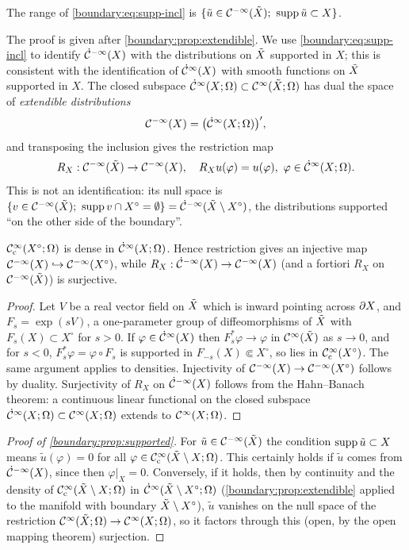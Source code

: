 \begin{proposition}\label{boundary:prop:supported}
The range of \eqref{boundary:eq:supp-incl} is $\{\tilde u\in\mathcal{C}^{-\infty}(\tilde{X});\
\operatorname{supp}\tilde u\subset X\}$.
\end{proposition}

The proof is given after \cref{boundary:prop:extendible}. We use
\eqref{boundary:eq:supp-incl} to identify $\dot{\mathcal{C}}^{-\infty}(X)$ with the distributions on $\tilde{X}$
supported in $X$; this is consistent with the identification of $\dot{\mathcal{C}}^\infty(X)$ with
smooth functions on $\tilde{X}$ supported in $X$. The closed subspace $\dot{\mathcal{C}}^\infty(X;\Omega)\subset
\mathcal{C}^\infty(\tilde{X};\Omega)$ has dual the space of \emph{extendible distributions}
\begin{equation*}
\mathcal{C}^{-\infty}(X)=\big(\dot{\mathcal{C}}^\infty(X;\Omega)\big)',
\end{equation*}
and transposing the inclusion gives the restriction map
\begin{equation}\label{boundary:eq:RX}
R_X:\CmI(\Xt)\to\CmI(X),\quad R_Xu(\varphi)=u(\varphi),\ \varphi\in\dCI(X;\Omega).
\end{equation}
This is not an identification: its null space is
$\{v\in\mathcal{C}^{-\infty}(\tilde{X});\ \operatorname{supp} v\cap X^\circ=\emptyset\}=\dot{\mathcal{C}}^{-\infty}(\tilde{X}\setminus X^\circ)$, the
distributions supported ``on the other side of the boundary''.

\begin{proposition}\label{boundary:prop:extendible}
$\mathcal{C}^\infty_{\mathrm{c}}(X^\circ;\Omega)$ is dense in $\dot{\mathcal{C}}^\infty(X;\Omega)$. Hence restriction gives an
injective map $\mathcal{C}^{-\infty}(X)\hookrightarrow\mathcal{C}^{-\infty}(X^\circ)$, while $R_X:\dot{\mathcal{C}}^{-\infty}(X)\to\mathcal{C}^{-\infty}(X)$
(and a fortiori $R_X$ on $\mathcal{C}^{-\infty}(\tilde{X})$) is surjective.
\end{proposition}
\begin{proof}
Let $V$ be a real vector field on $\tilde{X}$ which is inward pointing across $\partial X$, and
$F_s=\exp(sV)$, a one-parameter group of diffeomorphisms of $\tilde{X}$ with $F_s(X)\subset
X^\circ$ for $s>0$. If $\varphi\in\dot{\mathcal{C}}^\infty(X)$ then $F_s^*\varphi\to\varphi$ in $\mathcal{C}^\infty(\tilde{X})$
as $s\to0$, and for $s<0$, $F_s^*\varphi=\varphi\circ F_s$ is supported in
$F_{-s}(X)\Subset X^\circ$, so lies in $\mathcal{C}^\infty_{\mathrm{c}}(X^\circ)$. The same argument applies to
densities. Injectivity of $\mathcal{C}^{-\infty}(X)\to\mathcal{C}^{-\infty}(X^\circ)$ follows by duality. Surjectivity
of $R_X$ on $\dot{\mathcal{C}}^{-\infty}(X)$ follows from the Hahn--Banach theorem: a continuous linear
functional on the closed subspace $\dot{\mathcal{C}}^\infty(X;\Omega)\subset\mathcal{C}^\infty(X;\Omega)$ extends to
$\mathcal{C}^\infty(X;\Omega)$.
\end{proof}

\begin{proof}[Proof of \cref{boundary:prop:supported}]
For $\tilde u\in\mathcal{C}^{-\infty}(\tilde{X})$ the condition $\operatorname{supp}\tilde u\subset X$ means $\tilde
u(\varphi)=0$ for all $\varphi\in\mathcal{C}^\infty_{\mathrm{c}}(\tilde{X}\setminus X;\Omega)$. This certainly holds
if $\tilde u$ comes from $\dot{\mathcal{C}}^{-\infty}(X)$, since then $\varphi|_X=0$. Conversely, if it
holds, then by continuity and the density of $\mathcal{C}^\infty_{\mathrm{c}}(\tilde{X}\setminus X;\Omega)$ in
$\dot{\mathcal{C}}^\infty(\tilde{X}\setminus X^\circ;\Omega)$ (\cref{boundary:prop:extendible} applied to the
manifold with boundary $\tilde{X}\setminus X^\circ$), $\tilde u$ vanishes on the null space
of the restriction $\mathcal{C}^\infty(\tilde{X};\Omega)\to\mathcal{C}^\infty(X;\Omega)$, so it factors through this
(open, by the open mapping theorem) surjection.
\end{proof}

